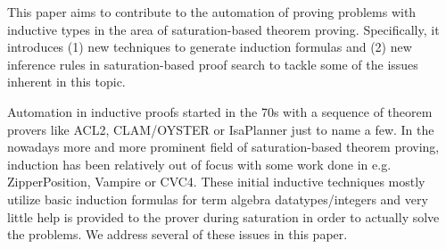 
This paper aims to contribute to the automation of proving problems with inductive types in the area of saturation-based theorem proving. Specifically, it introduces (1) new techniques to generate induction formulas and (2) new inference rules in saturation-based proof search to tackle some of the issues inherent in this topic.

Automation in inductive proofs started in the 70s with a sequence of theorem provers like ACL2, CLAM/OYSTER or IsaPlanner just to name a few. In the nowadays more and more prominent field of saturation-based theorem proving, induction has been relatively out of focus with some work done in e.g. ZipperPosition, Vampire or CVC4. These initial inductive techniques mostly utilize basic induction formulas for term algebra datatypes/integers and very little help is provided to the prover during saturation in order to actually solve the problems. We address several of these issues in this paper.

